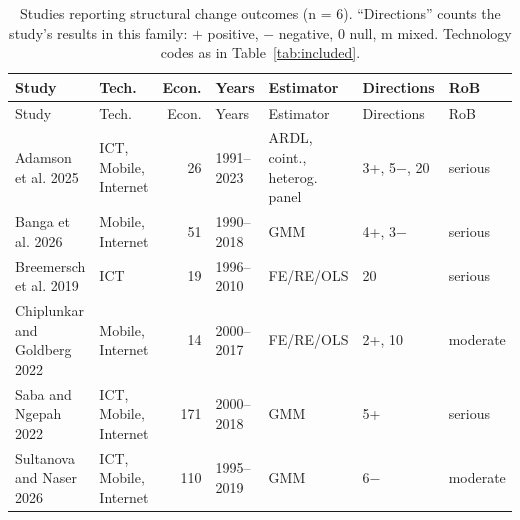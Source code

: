 {\scriptsize\setlength{\tabcolsep}{3pt}
\begin{longtable}{@{}p{3.1cm} p{1.9cm} r l p{2.4cm} p{2.3cm} l@{}}
\caption{Studies reporting structural change outcomes (n = 6). ``Directions'' counts the study's results in this family: $+$ positive, $-$ negative, 0 null, m mixed. Technology codes as in Table~\ref{tab:included}.}\label{tab:fam2}\\
\toprule Study & Tech. & Econ. & Years & Estimator & Directions & RoB \\ \midrule \endfirsthead
\toprule Study & Tech. & Econ. & Years & Estimator & Directions & RoB \\ \midrule \endhead
\bottomrule \endfoot
Adamson et al. 2025 & ICT, Mobile, Internet & 26 & 1991--2023 & ARDL, coint., heterog. panel & 3+, 5$-$, 20 & serious \\
Banga et al. 2026 & Mobile, Internet & 51 & 1990--2018 & GMM & 4+, 3$-$ & serious \\
Breemersch et al. 2019 & ICT & 19 & 1996--2010 & FE/RE/OLS & 20 & serious \\
Chiplunkar and Goldberg 2022 & Mobile, Internet & 14 & 2000--2017 & FE/RE/OLS & 2+, 10 & moderate \\
Saba and Ngepah 2022 & ICT, Mobile, Internet & 171 & 2000--2018 & GMM & 5+ & serious \\
Sultanova and Naser 2026 & ICT, Mobile, Internet & 110 & 1995--2019 & GMM & 6$-$ & moderate \\
\end{longtable}
}

